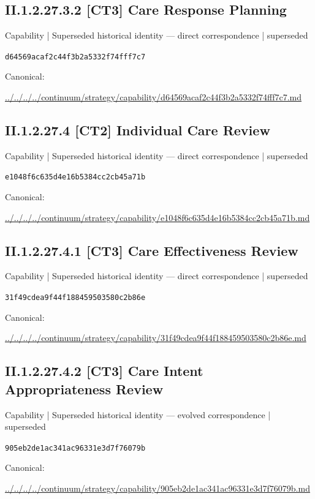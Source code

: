 \documentclass[10pt,a4paper]{article}
\begin{document}
\subsection*{II.1.2.27.3.2 [CT3] Care Response Planning}
{\small Capability | Superseded historical identity — direct correspondence | superseded}\par
\texttt{d64569acaf2c44f3b2a5332f74fff7c7}\par
Canonical: \par
{\footnotesize\url{../../../../continuum/strategy/capability/d64569acaf2c44f3b2a5332f74fff7c7.md}}\par
\subsection*{II.1.2.27.4 [CT2] Individual Care Review}
{\small Capability | Superseded historical identity — direct correspondence | superseded}\par
\texttt{e1048f6c635d4e16b5384cc2cb45a71b}\par
Canonical: \par
{\footnotesize\url{../../../../continuum/strategy/capability/e1048f6c635d4e16b5384cc2cb45a71b.md}}\par
\subsection*{II.1.2.27.4.1 [CT3] Care Effectiveness Review}
{\small Capability | Superseded historical identity — direct correspondence | superseded}\par
\texttt{31f49cdea9f44f188459503580c2b86e}\par
Canonical: \par
{\footnotesize\url{../../../../continuum/strategy/capability/31f49cdea9f44f188459503580c2b86e.md}}\par
\subsection*{II.1.2.27.4.2 [CT3] Care Intent Appropriateness Review}
{\small Capability | Superseded historical identity — evolved correspondence | superseded}\par
\texttt{905eb2de1ac341ac96331e3d7f76079b}\par
Canonical: \par
{\footnotesize\url{../../../../continuum/strategy/capability/905eb2de1ac341ac96331e3d7f76079b.md}}\par
\end{document}
